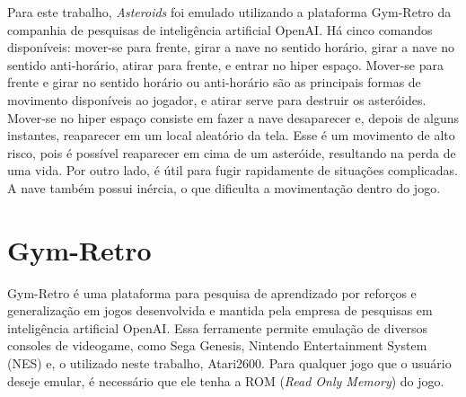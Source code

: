 Para este trabalho, \textit{Asteroids} foi emulado utilizando a plataforma Gym-Retro da companhia de pesquisas de inteligência artificial OpenAI.
Há cinco comandos disponíveis: mover-se para frente, girar a nave no sentido horário, girar a nave no sentido anti-horário, atirar para frente, e entrar no hiper espaço. Mover-se para frente e girar no sentido horário ou anti-horário são as principais formas de movimento disponíveis ao jogador, e atirar serve para destruir os asteróides. Mover-se no hiper espaço consiste em fazer a nave desaparecer e, depois de alguns instantes, reaparecer em um local aleatório da tela. Esse é um movimento de alto risco, pois é possível reaparecer em cima de um asteróide, resultando na perda de uma vida. Por outro lado, é útil para fugir rapidamente de situações complicadas.
A nave também possui inércia, o que dificulta a movimentação dentro do jogo.

\section{Gym-Retro}
\label{sec:gymretro}

Gym-Retro é uma plataforma para pesquisa de aprendizado por reforços e generalização em jogos desenvolvida e mantida pela empresa de pesquisas em inteligência artificial OpenAI. Essa ferramente permite emulação de diversos consoles de videogame, como Sega Genesis, Nintendo Entertainment System (NES) e, o utilizado neste trabalho, Atari2600. Para qualquer jogo que o usuário deseje emular, é necessário que ele tenha a ROM (\textit{Read Only Memory}) do jogo.

